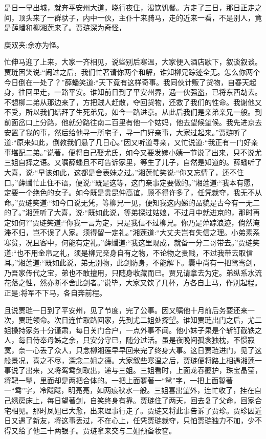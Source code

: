 \begin{parag}
    是日一早出城，就奔平安州大道，晓行夜住，渴饮饥餐。方走了三日，那日正走之间，顶头来了一群驮子，内中一伙，主仆十来骑马，走的近来一看，不是别人，竟是薛蟠和柳湘莲来了。贾琏深为奇怪，\begin{note}庚双夹:余亦为怪。\end{note}忙伸马迎了上来，大家一齐相见，说些别后寒温，大家便入酒店歇下，叙谈叙谈。贾琏因笑说:“闹过之后，我们忙著请你两个和解，谁知柳兄踪迹全无。怎么你两个今日倒在一处了？”薛蟠笑道:“天下竟有这样奇事。我同伙计贩了货物，自春天起身，往回里走，一路平安。谁知前日到了平安州界，遇一伙强盗，已将东西劫去。不想柳二弟从那边来了，方把贼人赶散，夺回货物，还救了我们的性命。我谢他又不受，所以我们结拜了生死弟兄，如今一路进京。从此后我们是亲弟亲兄一般。到前面岔口上分路，他就分路往南二百里有他一个姑妈，他去望候望候。我先进京去安置了我的事，然后给他寻一所宅子，寻一门好亲事，大家过起来。”贾琏听了道:“原来如此，倒教我们悬了几日心。”因又听道寻亲，又忙说道:“我正有一门好亲事堪配二弟。”说著，便将自己娶尤氏，如今又要发嫁小姨一节说了出来，只不说尤三姐自择之语。又嘱薛蟠且不可告诉家里，等生了儿子，自然是知道的。薛蟠听了大喜，说:“早该如此，这都是舍表妹之过。”湘莲忙笑说:“你又忘情了，还不住口。”薛蟠忙止住不语，便说:“既是这等，这门亲事定要做的。”湘莲道:“我本有愿，定要一个绝色的女子。如今既是贵昆仲高谊，顾不得许多了，任凭裁夺，我无不从命。”贾琏笑道:“如今口说无凭，等柳兄一见，便知我这内娣的品貌是古今有一无二的了。”湘莲听了大喜，说:“既如此说，等弟探过姑娘，不过月中就进京的，那时再定如何?”贾琏笑道:“你我一言为定，只是我信不过柳兄。你乃是萍踪浪迹，倘然淹滞不归，岂不误了人家。须得留一定礼。”湘莲道:“大丈夫岂有失信之理。小弟素系寒贫，况且客中，何能有定礼。”薛蟠道:“我这里现成，就备一分二哥带去。”贾琏笑道:“也不用金帛之礼，须是柳兄亲身自有之物，不论物之贵贱，不过我带去取信耳。”湘莲道:“既如此说，弟无别物，此剑防身，不能解下。囊中尚有一把鸳鸯剑，乃吾家传代之宝，弟也不敢擅用，只随身收藏而已。贾兄请拿去为定。弟纵系水流花落之性，然亦断不舍此剑者。”说毕，大家又饮了几杯，方各自上马，作别起程。正是:将军不下马，各自奔前程。
\end{parag}


\begin{parag}
    且说贾琏一日到了平安州，见了节度，完了公事。因又嘱他十月前后务要还来一次，贾琏领命。次日连忙取路回家，先到尤二姐处探望。谁知贾琏出门之后，尤二姐操持家务十分谨肃，每日关门合户，一点外事不闻。他小妹子果是个斩钉截铁之人，每日侍奉母姊之余，只安分守已，随分过活。虽是夜晚间孤衾独枕，不惯寂寞，奈一心丢了众人，只念柳湘莲早早回来完了终身大事。这日贾琏进门，见了这般景况，喜之不尽，深念二姐之德。大家叙些寒温之后，贾琏便将路上相遇湘莲一事说了出来，又将鸳鸯剑取出，递与三姐。三姐看时，上面龙吞夔护，珠宝晶莹，将靶一掣，里面却是两把合体的。一把上面錾著一“鸳”字，一把上面錾著一“鸯”字，冷飕飕，明亮亮，如两痕秋水一般。三姐喜出望外，连忙收了，挂在自己绣房床上，每日望著剑，自笑终身有靠。贾琏住了两天，回去复了父命，回家合宅相见。那时凤姐已大愈，出来理事行走了。贾琏又将此事告诉了贾珍。贾珍因近日又遇了新友，将这事丢过，不在心上，任凭贾琏裁夺，只怕贾琏独力不加，少不得又给了他三十两银子。贾琏拿来交与二姐预备妆奁。
\end{parag}


